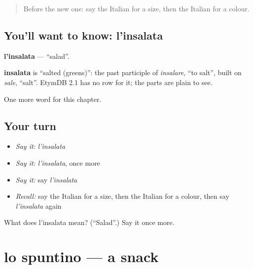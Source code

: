 \label{lesson:IT-C247-insalata}



\begin{quote}
Before the new one: say the Italian for a size, then the Italian for a colour.
\end{quote}

\subsection*{You'll want to know: l'insalata}
\textbf{l'insalata} — \textquotedblleft{}salad\textquotedblright{}.

\begin{cousinweb}
\textbf{insalata} is \textquotedblleft{}salted (greens)\textquotedblright{}: the past participle of \emph{insalare}, \textquotedblleft{}to salt\textquotedblright{}, built on \emph{sale}, \textquotedblleft{}salt\textquotedblright{}. EtymDB 2.1 has no row for it; the parts are plain to see.
\end{cousinweb}

\begin{grammarlens}[title={What you've built}]
One more word for this chapter.
\end{grammarlens}

\subsection*{Your turn}
\begin{itemize}
\raggedright
  \item \emph{Say it:} \emph{l'insalata}
  \item \emph{Say it:} \emph{l'insalata}, once more
  \item \emph{Say it:} say \emph{l'insalata}
  \item \emph{Recall:} say the Italian for a size, then the Italian for a colour, then say \emph{l'insalata} again
\end{itemize}

\begin{tcolorbox}[breakable,colback=teal!4,colframe=teal!35!black,title={Before you move on}]
What does l'insalata mean? (\textquotedblleft{}Salad\textquotedblright{}.) Say it once more.
\end{tcolorbox}
\section[lo spuntino]{lo spuntino — a snack}

